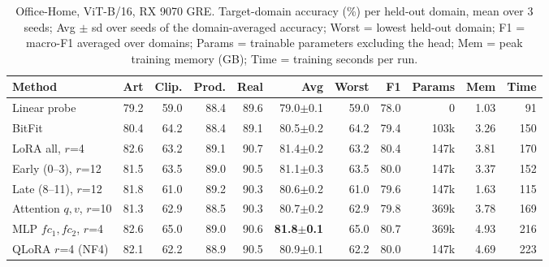 \begin{table}[t]
\centering\small
\begin{tabular}{lrrrrrrrrrr}
\toprule
Method & Art & Clip. & Prod. & Real & Avg & Worst & F1 & Params & Mem & Time \\
\midrule
Linear probe & 79.2 & 59.0 & 88.4 & 89.6 & 79.0$\pm$0.1 & 59.0 & 78.0 & 0 & 1.03 & 91 \\
BitFit & 80.4 & 64.2 & 88.4 & 89.1 & 80.5$\pm$0.2 & 64.2 & 79.4 & 103k & 3.26 & 150 \\
LoRA all, $r$=4 & 82.6 & 63.2 & 89.1 & 90.7 & 81.4$\pm$0.2 & 63.2 & 80.4 & 147k & 3.81 & 170 \\
\midrule
Early (0--3), $r$=12 & 81.5 & 63.5 & 89.0 & 90.5 & 81.1$\pm$0.3 & 63.5 & 80.0 & 147k & 3.37 & 152 \\
Late (8--11), $r$=12 & 81.8 & 61.0 & 89.2 & 90.3 & 80.6$\pm$0.2 & 61.0 & 79.6 & 147k & 1.63 & 115 \\
\midrule
Attention $q,v$, $r$=10 & 81.3 & 62.9 & 88.5 & 90.3 & 80.7$\pm$0.2 & 62.9 & 79.8 & 369k & 3.78 & 169 \\
MLP $fc_1,fc_2$, $r$=4 & 82.6 & 65.0 & 89.0 & 90.6 & \textbf{81.8$\pm$0.1} & 65.0 & 80.7 & 369k & 4.93 & 216 \\
\midrule
QLoRA $r$=4 (NF4) & 82.1 & 62.2 & 88.9 & 90.5 & 80.9$\pm$0.1 & 62.2 & 80.0 & 147k & 4.69 & 223 \\
\bottomrule
\end{tabular}
\caption{Office-Home, ViT-B/16, RX 9070 GRE. Target-domain accuracy (\%) per held-out domain, mean over 3 seeds; Avg $\pm$ sd over seeds of the domain-averaged accuracy; Worst = lowest held-out domain; F1 = macro-F1 averaged over domains; Params = trainable parameters excluding the head; Mem = peak training memory (GB); Time = training seconds per run.}
\label{tab:oh}
\end{table}
